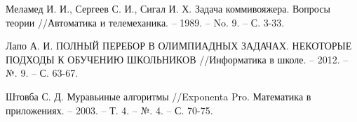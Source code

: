 \renewcommand{\bibname}{Список использованных источников}
\begin{thebibliography}{100}

Меламед И. И., Сергеев С. И., Сигал И. Х. Задача коммивояжера. Вопросы теории //Автоматика и телемеханика. – 1989. – No. 9. – С. 3-33.

Лапо А. И. ПОЛНЫЙ ПЕРЕБОР В ОЛИМПИАДНЫХ ЗАДАЧАХ. НЕКОТОРЫЕ ПОДХОДЫ К ОБУЧЕНИЮ ШКОЛЬНИКОВ //Информатика в школе. – 2012. – №. 9. – С. 63-67.

Штовба С. Д. Муравьиные алгоритмы //Exponenta Pro. Математика в приложениях. – 2003. – Т. 4. – №. 4. – С. 70-75.






\end{thebibliography}

\newpage